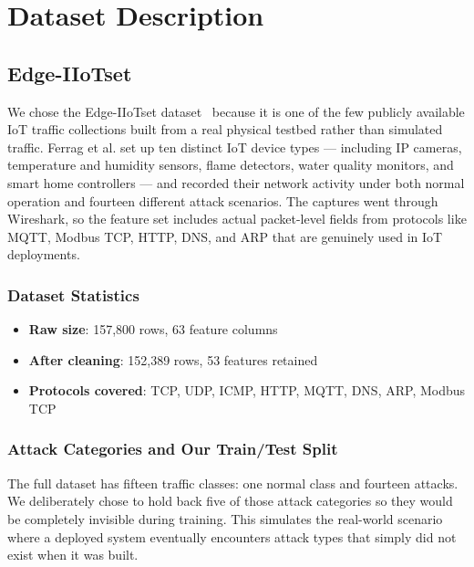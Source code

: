 \documentclass[12pt,a4paper]{report}
\begin{document}
\section{Dataset Description}

\subsection{Edge-IIoTset}

We chose the Edge-IIoTset dataset~\cite{dataset_edge_iiotset} because it is one
of the few publicly available IoT traffic collections built from a real physical
testbed rather than simulated traffic. Ferrag et al. set up ten distinct IoT device
types — including IP cameras, temperature and humidity sensors, flame detectors,
water quality monitors, and smart home controllers — and recorded their network
activity under both normal operation and fourteen different attack scenarios. The
captures went through Wireshark, so the feature set includes actual packet-level
fields from protocols like MQTT, Modbus TCP, HTTP, DNS, and ARP that are genuinely
used in IoT deployments.

\subsubsection{Dataset Statistics}

\begin{itemize}
  \item \textbf{Raw size}: 157,800 rows, 63 feature columns
  \item \textbf{After cleaning}: 152,389 rows, 53 features retained
  \item \textbf{Protocols covered}: TCP, UDP, ICMP, HTTP, MQTT, DNS, ARP,
        Modbus TCP
\end{itemize}

\subsubsection{Attack Categories and Our Train/Test Split}

The full dataset has fifteen traffic classes: one normal class and fourteen
attacks. We deliberately chose to hold back five of those attack categories so
they would be completely invisible during training. This simulates the real-world
scenario where a deployed system eventually encounters attack types that simply
did not exist when it was built.
\end{document}
